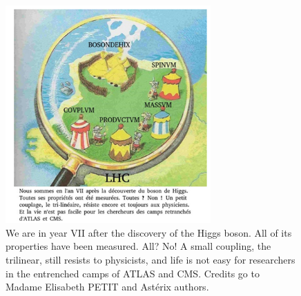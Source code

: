 \newpage

\begin{figure}
    \centering
    \includegraphics[width=0.7\textwidth]{FirstPages/Img/Petit.png}
    \caption{We are in year VII after the discovery of the Higgs boson. All of its properties have been measured. All? No! A small coupling, the trilinear, still resists to physicists, and life is not easy for researchers in the entrenched camps of ATLAS and CMS. Credits go to Madame Elisabeth PETIT and Astérix authors.  }
\end{figure}
